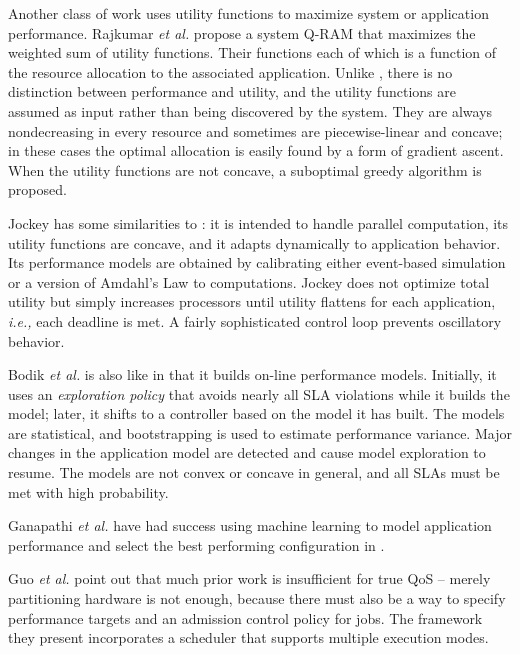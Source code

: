 Another class of work uses utility functions to maximize system or application performance. Rajkumar \emph{et al.}\cite{828990} propose a system Q-RAM that maximizes the weighted sum of utility functions. Their functions
each of which is a function of the resource allocation to the associated application.
Unlike \pacora, there is no distinction between performance and utility, and
the utility functions are assumed as input rather than being discovered by the system.
They are always nondecreasing in every resource and sometimes are piecewise-linear and concave;
in these cases the optimal allocation is easily found by a form of gradient ascent.
When the utility functions are not concave, a suboptimal greedy algorithm is proposed.

Jockey\cite{Jockey} has some similarities to \pacora: it is intended to handle parallel computation, its utility functions are concave,
and it adapts dynamically to application behavior.
Its performance models are obtained by calibrating either event-based simulation or a version of Amdahl's Law to computations.
Jockey does not optimize total utility but simply increases processors until utility flattens for each application,
\emph{i.e.,} each deadline is met.
A fairly sophisticated control loop prevents oscillatory behavior.




Bodik \emph{et al.}\cite{bodik-acdc09} is also like \pacora in that it builds on-line performance models.
Initially, it uses an \emph{exploration policy} that avoids nearly all SLA violations while it builds the model;
later, it shifts to a controller based on the model it has built.
The models are statistical, and bootstrapping is used to estimate performance variance.
Major changes in the application model are detected and cause model exploration to resume.
The models are not convex or concave in general, and all SLAs must be met with high probability.

Ganapathi \emph{et al.} have had success using machine learning to model application performance and select the best performing configuration in \cite{Archana}.

Guo \emph{et al.}\cite{1331730} point out that much prior work is insufficient for true QoS -- merely partitioning hardware is not enough, because there must also be a way to specify performance targets and an admission control policy for jobs.
The framework they present incorporates a scheduler that supports multiple execution modes.



